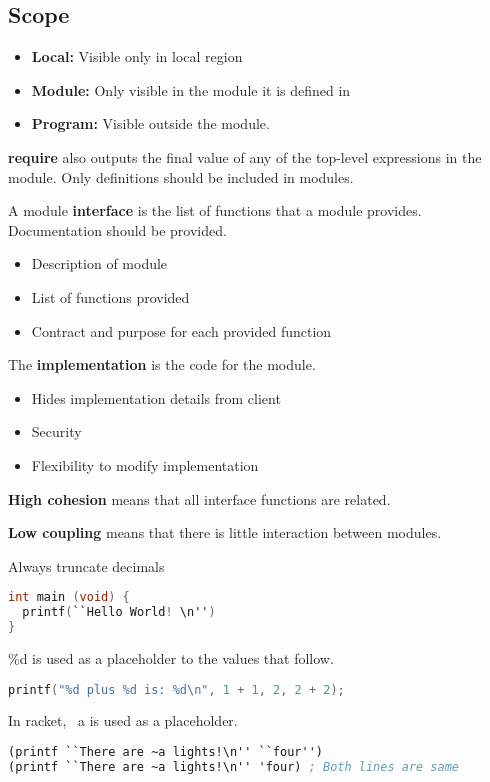 \documentclass[english, 12pt]{article}
\begin{document}
\subsection{Scope}
\begin{itemize}
\item \textbf{Local:} Visible only in local region
\item \textbf{Module:} Only visible in the module it is defined in
\item \textbf{Program:} Visible outside the module.
\end{itemize}
\begin{qte}
\textbf{require} also outputs the final value of any of the top-level expressions in the module. Only definitions should be included in modules.
\end{qte}
\begin{defn}
A module \textbf{interface} is the list of functions that a module provides. Documentation should be provided.
\begin{itemize}
\item Description of module
\item List of functions provided
\item Contract and purpose for each provided function
\end{itemize}
\end{defn}
\begin{defn}
The \textbf{implementation} is the code for the module.
\begin{itemize}
\item Hides implementation details from client
\item Security
\item Flexibility to modify implementation
\end{itemize}
\end{defn}

\begin{defn}
\textbf{High cohesion} means that all interface functions are related.
\end{defn}
\begin{defn}
\textbf{Low coupling} means that there is little interaction between modules.
\end{defn}

\begin{qte}
Always truncate decimals
\end{qte}


\begin{lstlisting}[language=C]
int main (void) {
  printf(``Hello World! \n'')
}
\end{lstlisting}
\begin{defn}
\%d is used as a placeholder to the values that follow.
\begin{lstlisting}[language=C]
printf("%d plus %d is: %d\n", 1 + 1, 2, 2 + 2);
\end{lstlisting}
In racket, ~a is used as a placeholder.
\begin{lstlisting}[language=Scheme]
(printf ``There are ~a lights!\n'' ``four'')
(printf ``There are ~a lights!\n'' 'four) ; Both lines are same
\end{lstlisting}
\end{defn}
\end{document}
